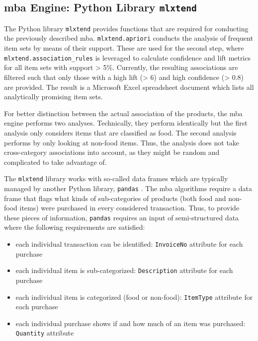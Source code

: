 \subsection{\acs{mba} Engine: Python Library \texttt{mlxtend}}
The Python library \texttt{mlxtend} provides functions that are required for conducting the previously described \ac{mba}. \texttt{mlxtend.apriori} conducts the analysis of frequent item sets by means of their support. These are used for the second step, where \texttt{mlxtend.association\_rules} is leveraged to calculate confidence and lift metrics \cite{mlxtend} for all item sets with support > 5\%. Currently, the resulting associations are filtered such that only those with a high lift (> 6) and high confidence (> 0.8) are provided. The result is a Microsoft Excel spreadsheet document which lists all analytically promising item sets.

For better distinction between the actual association of the products, the \ac{mba} engine performs two analyses. Technically, they perform identically but the first analysis only considers items that are classified as food. The second analysis performs by only looking at non-food items. Thus, the analysis does not take cross-category associations into account, as they might be random and complicated to take advantage of.

The \texttt{mlxtend} library works with so-called data frames which are typically managed by another Python library, \texttt{pandas} \cite{pandas}. The \ac{mba} algorithms require a data frame that flags what kinds of sub-categories of products (both food and non-food items) were purchased in every considered transaction. Thus, to provide these pieces of information, \texttt{pandas} requires an input of semi-structured data \cite{pandas} where the following requirements are satisfied:

\begin{itemize}
	\item each individual transaction can be identified: \texttt{InvoiceNo} attribute for each purchase
	\item each individual item is sub-categorized: \texttt{Description} attribute for each purchase
	\item each individual item is categorized (food or non-food): \texttt{ItemType} attribute for each purchase
	\item each individual purchase shows if and how much of an item was purchased: \texttt{Quantity} attribute
\end{itemize}

